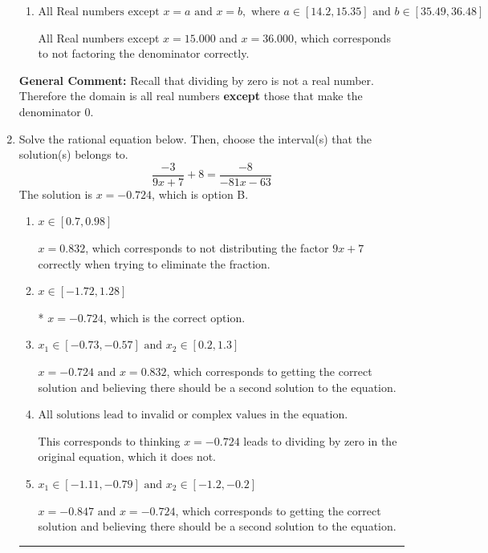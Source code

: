 \documentclass{extbook}[14pt]
\newcommand{\litem}[1]{\item #1

\rule{\textwidth}{0.4pt}}
\begin{document}
\begin{enumerate}
{\begin{enumerate}[label=\Alph*.]
All Real numbers except $x = 1.000$, which corresponds to removing only 1 value from the denominator.
\item \( \text{All Real numbers except } x = a \text{ and } x = b, \text{ where } a \in [14.2, 15.35] \text{ and } b \in [35.49, 36.48] \)

All Real numbers except $x = 15.000$ and $x = 36.000$, which corresponds to not factoring the denominator correctly.
\end{enumerate}

\textbf{General Comment:} Recall that dividing by zero is not a real number. Therefore the domain is all real numbers \textbf{except} those that make the denominator 0.
}
\litem{
Solve the rational equation below. Then, choose the interval(s) that the solution(s) belongs to.
\[ \frac{-3}{9x + 7} + 8 = \frac{-8}{-81x -63} \]The solution is \( x = -0.724 \), which is option B.\begin{enumerate}[label=\Alph*.]
\item \( x \in [0.7,0.98] \)

$x = 0.832$, which corresponds to not distributing the factor $9x + 7$ correctly when trying to eliminate the fraction.
\item \( x \in [-1.72,1.28] \)

* $x = -0.724$, which is the correct option.
\item \( x_1 \in [-0.73, -0.57] \text{ and } x_2 \in [0.2,1.3] \)

$x = -0.724 \text{ and } x = 0.832$, which corresponds to getting the correct solution and believing there should be a second solution to the equation.
\item \( \text{All solutions lead to invalid or complex values in the equation.} \)

This corresponds to thinking $x = -0.724$ leads to dividing by zero in the original equation, which it does not.
\item \( x_1 \in [-1.11, -0.79] \text{ and } x_2 \in [-1.2,-0.2] \)

$x = -0.847 \text{ and } x = -0.724$, which corresponds to getting the correct solution and believing there should be a second solution to the equation.
\end{enumerate}

}
\end{enumerate}
\end{document}
